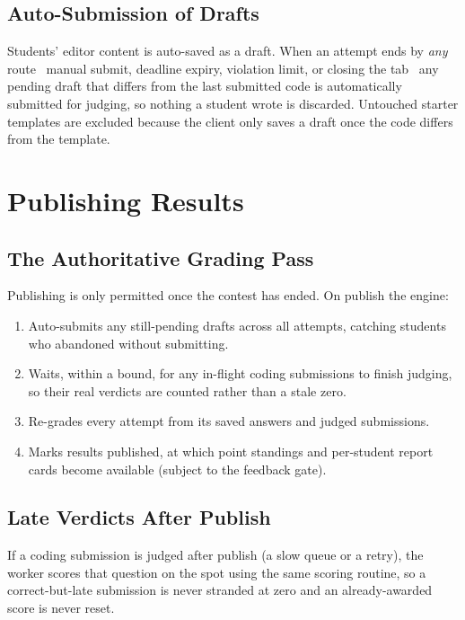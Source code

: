 \documentclass[12pt,a4paper,oneside]{report}
\begin{document}
\section{Auto-Submission of Drafts}
Students' editor content is auto-saved as a draft. When an attempt ends by
\emph{any} route \textemdash\ manual submit, deadline expiry, violation limit, or
closing the tab \textemdash\ any pending draft that differs from the last
submitted code is automatically submitted for judging, so nothing a student wrote
is discarded. Untouched starter templates are excluded because the client only
saves a draft once the code differs from the template.

\chapter{Publishing Results}
\section{The Authoritative Grading Pass}
Publishing is only permitted once the contest has ended. On publish the engine:
\begin{enumerate}[leftmargin=1.6em]
  \item Auto-submits any still-pending drafts across all attempts, catching
        students who abandoned without submitting.
  \item Waits, within a bound, for any in-flight coding submissions to finish
        judging, so their real verdicts are counted rather than a stale zero.
  \item Re-grades every attempt from its saved answers and judged submissions.
  \item Marks results published, at which point standings and per-student report
        cards become available (subject to the feedback gate).
\end{enumerate}

\section{Late Verdicts After Publish}
If a coding submission is judged after publish (a slow queue or a retry), the
worker scores that question on the spot using the same scoring routine, so a
correct-but-late submission is never stranded at zero and an already-awarded
score is never reset.
\end{document}
